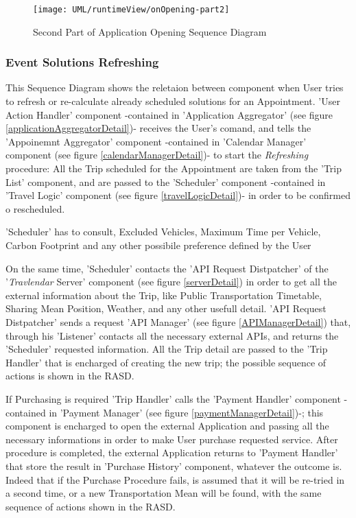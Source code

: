 	\vfill
	
	\begin{figure}[ht!]\ContinuedFloat
		\centering
		\texttt{[image: UML/runtimeView/onOpening-part2]}
		\caption{Second Part of Application Opening Sequence Diagram}
		\label{loginRunTimeView}
	\end{figure}
	

\subsubsection{Event Solutions Refreshing}
	
	This Sequence Diagram shows the reletaion between component when User tries to refresh or re-calculate already scheduled solutions for an Appointment.
	'User Action Handler' component  -contained in 'Application Aggregator' (see figure \ref{applicationAggregatorDetail})- receives the User's comand, and tells the 'Appoinemnt Aggregator' component -contained in 'Calendar Manager' component (see figure \ref{calendarManagerDetail})- to start the \textsl{Refreshing} procedure:
	All the Trip scheduled for the Appointment are taken from the 'Trip List' component, and are passed to the 'Scheduler' component  -contained in 'Travel Logic' component (see figure \ref{travelLogicDetail})-  in order to be confirmed o rescheduled.
	
	'Scheduler' has to consult, Excluded Vehicles, Maximum Time per Vehicle, Carbon Footprint and any other possibile preference defined by the User
	
	On the same time, 'Scheduler' contacts the 'API Request Distpatcher' of the '\textit{Travlendar} Server' component (see figure \ref{serverDetail}) in order to get all the external information about the Trip, like Public Transportation Timetable, Sharing Mean Position, Weather, and any other usefull detail.
	'API Request Distpatcher' sends a request 'API Manager' (see figure \ref{APIManagerDetail}) that, through his 'Listener' contacts all the necessary external APIs, and returns the 'Scheduler' requested information.
	All the Trip detail are passed to the 'Trip Handler' that is encharged of creating the new trip; the possible sequence of actions is shown in the RASD.
	
	If Purchasing is required 'Trip Handler' calls the 'Payment Handler' component  -contained in 'Payment Manager' (see figure \ref{paymentManagerDetail})-; this component is encharged to open the external Application and passing all the necessary informations in order to make User purchase requested service.
	After procedure is completed, the external Application returns to 'Payment Handler' that store the result in 'Purchase History' component, whatever the outcome is.
	Indeed that if the Purchase Procedure fails, is assumed that it will be re-tried in a second time, or a new Transportation Mean will be found, with the same sequence of actions shown in the RASD.
	
